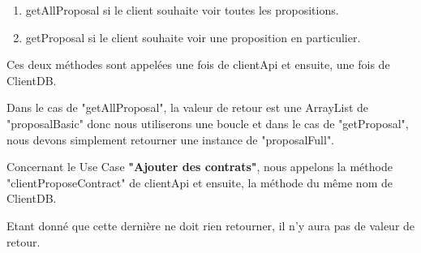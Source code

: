 \begin{enumerate}
\item getAllProposal si le client souhaite voir toutes les propositions.
\item getProposal si le client souhaite voir une proposition en particulier.
\end{enumerate}

\begin{flushleft}
Ces deux méthodes sont appelées une fois de clientApi et ensuite, une fois de ClientDB.
\end{flushleft}

\begin{flushleft}
Dans le cas de "getAllProposal", la valeur de retour est une ArrayList de "proposalBasic" donc nous utiliserons une boucle et dans le cas de "getProposal", nous devons simplement retourner une instance de "proposalFull".
\end{flushleft}

\begin{flushleft}
Concernant le Use Case \textbf{"Ajouter des contrats"}, nous appelons la méthode "clientProposeContract" de clientApi et ensuite, la méthode du même nom de ClientDB.
\end{flushleft}

\begin{flushleft}
Etant donné que cette dernière ne doit rien retourner, il n'y aura pas de valeur de retour.
\end{flushleft}

